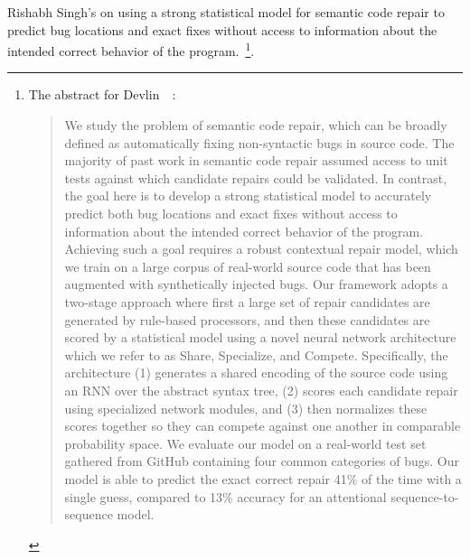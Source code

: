 Rishabh Singh's {} on using a strong statistical model for semantic code repair to predict bug locations and exact fixes without access to information about the intended correct behavior of the program.~\cite{DevlinetalICLR-18}\footnote{%
%
  The abstract for Devlin~\etal{}~\cite{DevlinetalICLR-18}:
%
  \begin{quotation}
%
    We study the problem of semantic code repair, which can be broadly defined as automatically fixing non-syntactic bugs in source code. The majority of past work in semantic code repair assumed access to unit tests against which candidate repairs could be validated. In contrast, the goal here is to develop a strong statistical model to accurately predict both bug locations and exact fixes without access to information about the intended correct behavior of the program. Achieving such a goal requires a robust contextual repair model, which we train on a large corpus of real-world source code that has been augmented with synthetically injected bugs. Our framework adopts a two-stage approach where first a large set of repair candidates are generated by rule-based processors, and then these candidates are scored by a statistical model using a novel neural network architecture which we refer to as Share, Specialize, and Compete. Specifically, the architecture (1) generates a  shared encoding of the source code using an RNN over the abstract syntax tree, (2) scores each candidate repair using specialized network modules, and (3) then normalizes these scores together so they can compete against one another in comparable probability space. We evaluate our model on a real-world test set gathered from GitHub containing four common categories of bugs. Our model is able to predict the exact correct repair 41\% of the time with a single guess, compared to 13\% accuracy for an attentional sequence-to-sequence model.
%
  \end{quotation}}.

